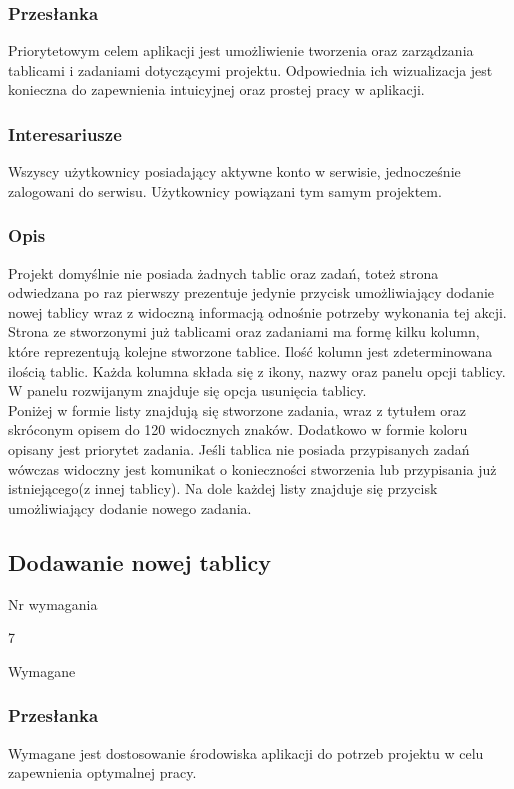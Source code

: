 \documentclass[eng,printmode]{mgr}
\begin{document}
\subsubsection{Przesłanka}
Priorytetowym celem aplikacji jest umożliwienie tworzenia oraz zarządzania tablicami i zadaniami dotyczącymi projektu. Odpowiednia ich wizualizacja jest konieczna do zapewnienia intuicyjnej oraz prostej pracy w aplikacji.

\subsubsection{Interesariusze}
Wszyscy użytkownicy posiadający aktywne konto w serwisie, jednocześnie zalogowani do serwisu. Użytkownicy powiązani tym samym projektem.

\subsubsection{Opis}
Projekt domyślnie nie posiada żadnych tablic oraz zadań, toteż strona odwiedzana po raz pierwszy prezentuje jedynie przycisk umożliwiający dodanie nowej tablicy wraz z widoczną informacją odnośnie potrzeby wykonania tej akcji. \\
Strona ze stworzonymi już tablicami oraz zadaniami ma formę kilku kolumn, które reprezentują kolejne stworzone tablice. Ilość kolumn jest zdeterminowana ilością tablic. Każda kolumna składa się z ikony, nazwy oraz panelu opcji tablicy. W panelu rozwijanym znajduje się opcja usunięcia tablicy. \\
Poniżej w formie listy znajdują się stworzone zadania, wraz z tytułem oraz skróconym opisem do 120 widocznych znaków. Dodatkowo w formie koloru opisany jest priorytet zadania. Jeśli tablica nie posiada przypisanych zadań wówczas widoczny jest komunikat o konieczności stworzenia lub przypisania już istniejącego(z innej tablicy). Na dole każdej listy znajduje się przycisk umożliwiający dodanie nowego zadania.

\subsection{Dodawanie nowej tablicy}
\begin{labeling}{Nr wymagania}
\item [Nr wymagania:] 7
\item [Priorytet:] Wymagane
\end{labeling}

\subsubsection{Przesłanka}
Wymagane jest dostosowanie środowiska aplikacji do potrzeb projektu w celu zapewnienia optymalnej pracy.
\end{document}
